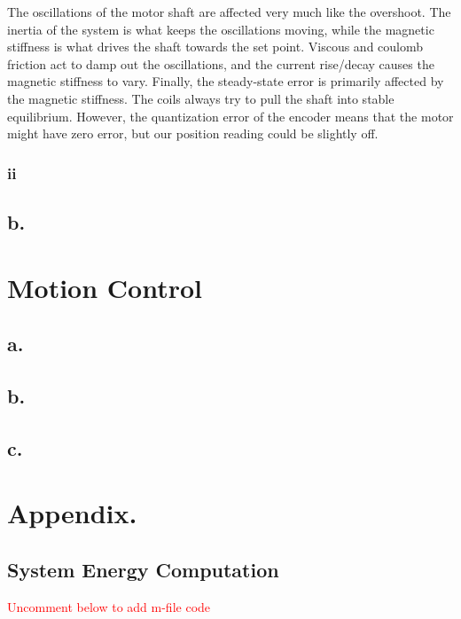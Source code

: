 \documentclass{article}
\newcommand{\xxx}[1]{\textcolor{red}{#1}}
\theoremstyle{plain}
\theoremstyle{definition}
\theoremstyle{remark}
\begin{document}
The oscillations of the motor shaft are affected very much like the overshoot. The inertia of the system is what keeps the oscillations moving, while the magnetic stiffness is what drives the shaft towards the set point. Viscous and coulomb friction act to damp out the oscillations, and the current rise/decay causes the magnetic stiffness to vary. Finally, the steady-state error is primarily affected by the magnetic stiffness. The coils always try to pull the shaft into stable equilibrium. However, the quantization error of the encoder means that the motor might have zero error, but our position reading could be slightly off.\\


\clearpage
\subsubsection*{ii}
\subsection*{b.}

\clearpage

\section{Motion Control}
\subsection*{a.}
\subsection*{b.}
\subsection*{c.}

\clearpage




\clearpage
\section*{Appendix.}

\subsection*{System Energy Computation}
\xxx{Uncomment below to add m-file code}
%
\end{document}
